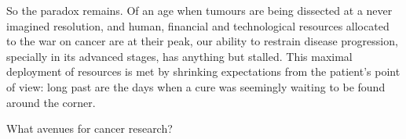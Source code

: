 


\bigskip{}






\smallskip{}

So the paradox remains.  Of an age when tumours are being dissected at a never
imagined resolution, and human, financial and technological resources allocated
to the war on cancer are at their peak, our ability to restrain disease
progression, specially in its advanced stages, has anything but stalled.  This
maximal deployment of resources is met by shrinking expectations from the
patient's point of view: long past are the days when a cure was seemingly
waiting to be found around the corner.

What avenues for cancer research?

\clearpage




